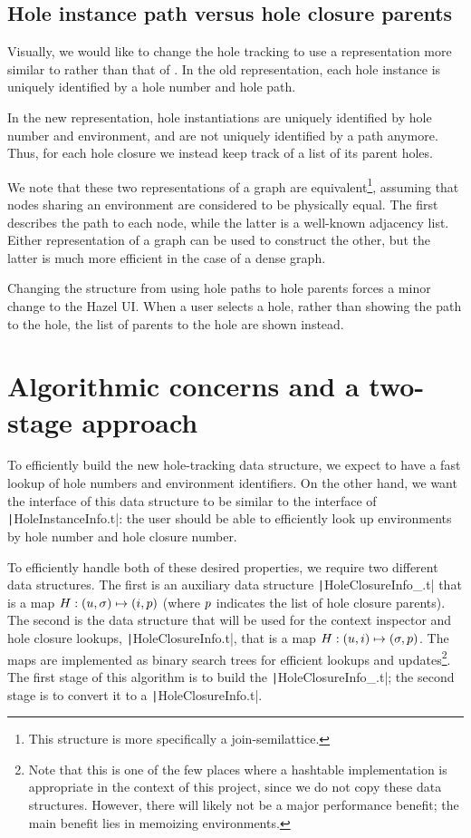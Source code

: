 \subsection{Hole instance path versus hole closure parents}
\label{sec:closure-parents}

Visually, we would like to change the hole tracking to use a representation more similar to  rather than that of . In the old representation, each hole instance is uniquely identified by a hole number and hole path.

In the new representation, hole instantiations are uniquely identified by hole number and environment, and are not uniquely identified by a path anymore. Thus, for each hole closure we instead keep track of a list of its parent holes.

We note that these two representations of a graph are equivalent\footnote{This structure is more specifically a join-semilattice.}, assuming that nodes sharing an environment are considered to be physically equal. The first describes the path to each node, while the latter is a well-known adjacency list. Either representation of a graph can be used to construct the other, but the latter is much more efficient in the case of a dense graph.

Changing the structure from using hole paths to hole parents forces a minor change to the Hazel UI. When a user selects a hole, rather than showing the path to the hole, the list of parents to the hole are shown instead.

\section{Algorithmic concerns and a two-stage approach}
\label{sec:two-stage-renumber}

To efficiently build the new hole-tracking data structure, we expect to have a fast lookup of hole numbers and environment identifiers. On the other hand, we want the interface of this data structure to be similar to the interface of \texttt|HoleInstanceInfo.t|: the user should be able to efficiently look up environments by hole number and hole closure number.

To efficiently handle both of these desired properties, we require two different data structures. The first is an auxiliary data structure \texttt|HoleClosureInfo_.t| that is a map $H:(u,\sigma)\mapsto(i,p)$ (where $p$ indicates the list of hole closure parents). The second is the data structure that will be used for the context inspector and hole closure lookups, \texttt|HoleClosureInfo.t|, that is a map $H:(u,i)\mapsto(\sigma,p)$. The maps are implemented as binary search trees for efficient lookups and updates\footnote{Note that this is one of the few places where a hashtable implementation is appropriate in the context of this project, since we do not copy these data structures. However, there will likely not be a major performance benefit; the main benefit lies in memoizing environments.}. The first stage of this algorithm is to build the \texttt|HoleClosureInfo_.t|; the second stage is to convert it to a \texttt|HoleClosureInfo.t|.

